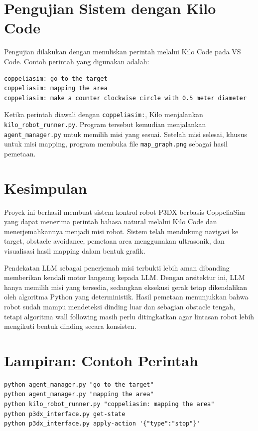 \documentclass{article}
\begin{document}
\section{Pengujian Sistem dengan Kilo Code}

Pengujian dilakukan dengan menuliskan perintah melalui Kilo Code pada VS Code. Contoh perintah yang digunakan adalah:

\begin{lstlisting}[style=bashstyle]
coppeliasim: go to the target
coppeliasim: mapping the area
coppeliasim: make a counter clockwise circle with 0.5 meter diameter
\end{lstlisting}

Ketika perintah diawali dengan \texttt{coppeliasim:}, Kilo menjalankan \texttt{kilo\_robot\_runner.py}. Program tersebut kemudian menjalankan \texttt{agent\_manager.py} untuk memilih misi yang sesuai. Setelah misi selesai, khusus untuk misi mapping, program membuka file \texttt{map\_graph.png} sebagai hasil pemetaan.

\section{Kesimpulan}

Proyek ini berhasil membuat sistem kontrol robot P3DX berbasis CoppeliaSim yang dapat menerima perintah bahasa natural melalui Kilo Code dan menerjemahkannya menjadi misi robot. Sistem telah mendukung navigasi ke target, obstacle avoidance, pemetaan area menggunakan ultrasonik, dan visualisasi hasil mapping dalam bentuk grafik.

Pendekatan LLM sebagai penerjemah misi terbukti lebih aman dibanding memberikan kendali motor langsung kepada LLM. Dengan arsitektur ini, LLM hanya memilih misi yang tersedia, sedangkan eksekusi gerak tetap dikendalikan oleh algoritma Python yang deterministik. Hasil pemetaan menunjukkan bahwa robot sudah mampu mendeteksi dinding luar dan sebagian obstacle tengah, tetapi algoritma wall following masih perlu ditingkatkan agar lintasan robot lebih mengikuti bentuk dinding secara konsisten.

\section{Lampiran: Contoh Perintah}

\begin{lstlisting}[style=bashstyle]
python agent_manager.py "go to the target"
python agent_manager.py "mapping the area"
python kilo_robot_runner.py "coppeliasim: mapping the area"
python p3dx_interface.py get-state
python p3dx_interface.py apply-action '{"type":"stop"}'
\end{lstlisting}
\end{document}
